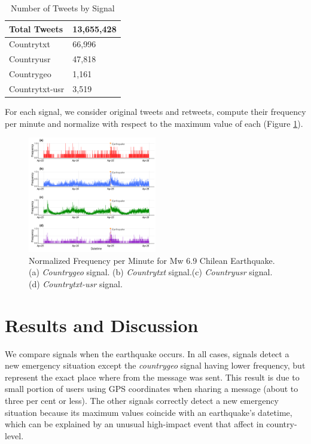 \documentclass{ewic}
\begin{document}
\begin{table}[]
	\centering
	\caption{Number of Tweets by Signal}
	\begin{tabular}{|l|l|}
		\hline
		Total Tweets    & 13,655,428 \\ \hline
		Countrytxt     & 66,996     \\ \hline
		Countryusr     & 47,818     \\ \hline
		Countrygeo     & 1,161      \\ \hline
		Countrytxt-usr & 3,519      \\ \hline
	\end{tabular}
	
	\label{signalsTweets}
\end{table}

For each signal, we consider original tweets and retweets, compute their frequency per minute and normalize with respect to the maximum value of each (Figure \ref{signalsTweets}).

\begin{figure}[h]
	
	\centering
	\includegraphics[width=0.5\textwidth]{img/freq_per_minute.png}
	\caption{Normalized Frequency per Minute for Mw 6.9 Chilean Earthquake. (a) \textit{Countrygeo} signal. (b) \textit{Countrytxt} signal.(c) \textit{Countryusr} signal. (d) \textit{Countrytxt-usr} signal.}
\end{figure}

\section{Results and Discussion}

We compare signals when the earthquake occurs. In all cases, signals detect a new emergency situation except the \textit{countrygeo} signal having lower frequency, but represent the exact place where from the message was sent. This result is due to small portion of users using GPS coordinates when sharing a message (about to three per cent or less). The other signals correctly detect  a new emergency situation because its maximum values coincide with an earthquake's datetime, which can be explained by an unusual high-impact event that affect in country-level.
\end{document}
